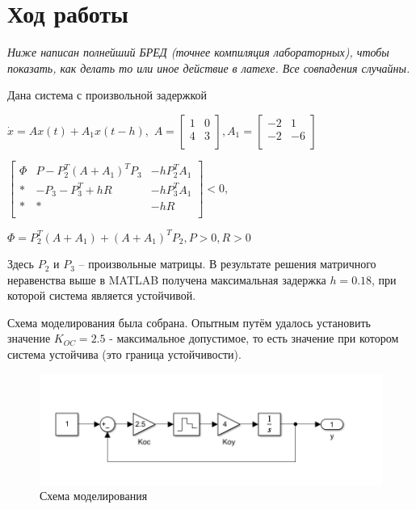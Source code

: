 \section{Ход работы}

\textit{Ниже написан полнейший БРЕД (точнее компиляция лабораторных), чтобы показать, как делать то или иное действие в латехе. Все совпадения случайны.}

Дана система с произвольной задержкой

$\dot{x} = Ax(t) + A_1 x (t-h), $
$A = 
\begin{bmatrix}
1 &  0\\
4 & 3\\
\end{bmatrix},
A_1 = 
\begin{bmatrix}
-2 & 1 \\
-2 & -6\\
\end{bmatrix}$

$\begin{bmatrix}
\Phi & P - P_2^T (A+A_1)^T P_3 & -h P_2^T A_1\\
* & -P_3 - P_3^T + hR & -h P_3^T A_1\\
* & * & -hR\\
\end{bmatrix} < 0,
$

$\Phi = P_2^T (A+A_1) + (A+A_1)^T P_2, P > 0, R > 0$

Здесь $P_2$ и $P_3$ – произвольные матрицы. В результате решения матричного неравенства выше в MATLAB получена максимальная задержка $h = 0.18$, при которой система является устойчивой. 

Схема моделирования была собрана. Опытным путём удалось установить значение $K_{OC} = 2.5$ - максимальное допустимое, то есть значение при котором система устойчива (это граница устойчивости).

\begin{figure}[H]
    \centering
\includegraphics[width=1.\linewidth,center]{assets/images/example1/1.png}
    \caption{Схема моделирования}
    \label{fig:p1}
\end{figure}

